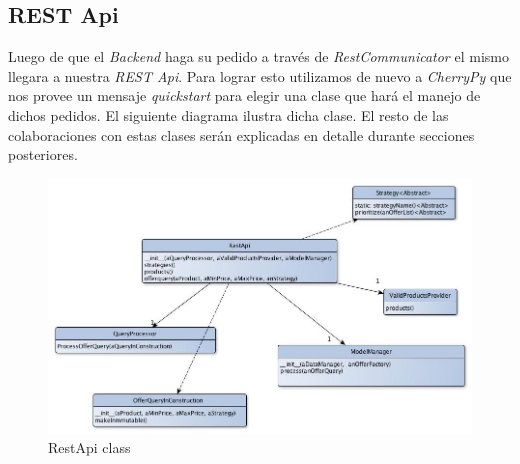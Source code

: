 \documentclass[10pt, a4paper]{article}
\begin{document}
\subsection{REST Api}
Luego de que el \emph{Backend} haga su pedido a trav\'es de \emph{RestCommunicator} el mismo llegara a nuestra \emph{REST Api}. Para lograr esto utilizamos de nuevo a \emph{CherryPy} que nos provee un mensaje \emph{quickstart} para elegir una clase que hará el manejo de dichos pedidos. El siguiente diagrama ilustra dicha clase. El resto de las colaboraciones con estas clases ser\'an explicadas en detalle durante secciones posteriores.

\begin{figure}[H]
\centering
\includegraphics[scale=0.5]{graphics/rest_api_class.jpg}
\caption{RestApi class}
\end{figure}
\end{document}
